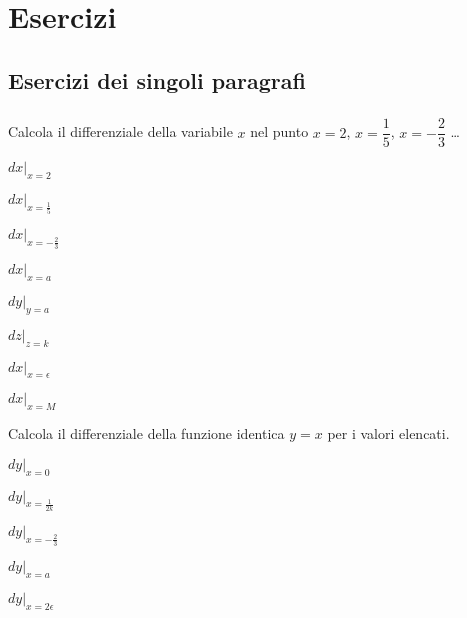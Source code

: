 
\section{Esercizi}

\subsection{Esercizi dei singoli paragrafi}

\subsubsection*{}
\begin{esercizio}
\label{ese:dif01}
 Calcola il differenziale della variabile \(x\) nel punto \(x=2\), 
\(x=\dfrac{1}{5}\), \(x=-\dfrac{2}{3}\) \dots
\begin{multicols}{2}
\begin{enumeratea}
  \item \(dx|_{x=2}\)
 \item \(dx|_{x=\frac{1}{5}}\)
 \item \(dx|_{x=-\frac{2}{3}}\)
 \item \(dx|_{x=a}\) 
\item \(dy|_{y=a}\)
 \item \(dz|_{z=k}\)
 \item \(dx|_{x=\epsilon}\)
 \item \(dx|_{x=M}\)
\end{enumeratea}
\end{multicols}
\end{esercizio}

\begin{esercizio}
\label{ese:dif02}
 Calcola il differenziale della funzione identica \(y=x\) per i valori elencati.
\begin{enumeratea}
 \item \(dy|_{x=0}\)
 \item \(dy|_{x=\frac{1}{2k}}\)
 \item \(dy|_{x=-\frac{2}{3}}\)
 \item \(dy|_{x=a} \)
 \item \(dy|_{x=2\epsilon} \)
 \end{enumeratea}
\end{esercizio}
 
